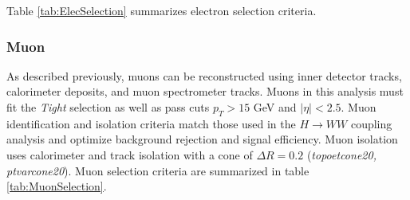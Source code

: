 Table \ref{tab:ElecSelection} summarizes electron selection criteria.

\begin{table}[h!]
  \centering
  \caption{Electron selections}
  \label{tab:ElecSelection}
\end{table}

\subsubsection{Muon}

As described previously, muons can be reconstructed using inner detector tracks, calorimeter deposits, and muon spectrometer tracks. Muons in this analysis must fit the \textit{Tight} selection as well as pass cuts $p_T>15$ GeV and $|\eta|<2.5$. Muon identification and isolation criteria match those used in the $H\rightarrow WW$ coupling analysis and optimize background rejection and signal efficiency. Muon isolation uses calorimeter and track isolation with a cone of $\Delta R=0.2$ (\textit{topoetcone20, ptvarcone20}). 
Muon selection criteria are summarized in table \ref{tab:MuonSelection}. 

\begin{table}[h]
  \centering
  \caption{Muon selections}
  \label{tab:MuonSelection}
\end{table}


